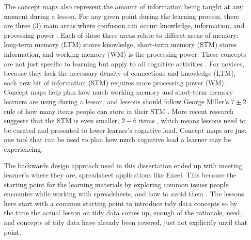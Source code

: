 \documentclass[010-intro.tex]{subfiles}
\begin{document}
        The concept maps also represent the amount of information being taught at any moment during a lesson.
        For any given point during the learning process,
        there are three (3) main areas where confusion can occur:
        knowledge, information, and processing power \cite{hermansProgrammerBrain2021}.
        Each of these three areas relate to differet areas of memory:
        long-term memory (LTM) stores knowledge,
        short-term memory (STM) stores information, and
        working memory (WM) is the processing power.
        These concepts are not just specific to learning but apply to all cognitive activities
        \cite{hermansProgrammerBrain2021}.
        For novices, because they lack the necessary density of connections and knowledge (LTM),
        each new bit of information (STM) requires more processing power (WM).
        Concept maps help plan how much working memory and short-term memory learners are using during a lesson,
        and lessons should follow George Miller's $7\pm2$ rule of how many items people can store in their STM
        \cite{miller1956magical}.
        More recent research suggests that the STM is even smaller, $2-6$ items
        \cite{hermansProgrammerBrain2021},
        which means lessons need to be curated and presented to lower learner's cognitive load.
        Concept maps are just one tool that can be used to plan how much cognitive load a learner may be experiencing.

        The backwards design approach used in this dissertation ended up with meeting learner's where they are,
        spreadsheet applications like Excel.
        This because the starting point for the learning materials by exploring common issues people encounter while
        working with spreadsheets, and how to avoid them
        \cite{bromanDataOrganizationSpreadsheets2018}.
        The lessons here start with a common starting point to introduce tidy data concepts so by
        the time the actual lesson on tidy data comes up,
        enough of the rationale, need, and concepts of tidy data have already been covered,
        just not explicitly until that point.
\end{document}
